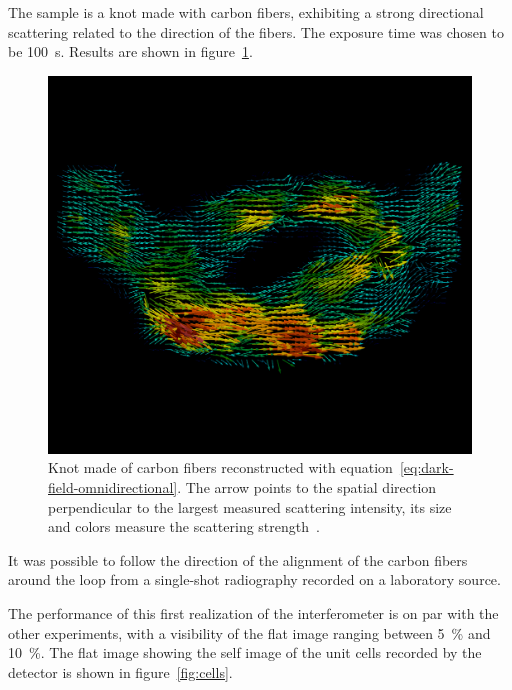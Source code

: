 The sample is a knot made with carbon fibers, exhibiting a strong
directional scattering related to the direction of the fibers. The exposure
time was chosen to be \SI{100}{\second}.
Results are shown in figure~\ref{fig:knot-reconstruction}.

\begin{figure}[htb]
    \centering
    \includegraphics[width=\textwidth]{gfx/omnidirectional/filtered.png}
    \caption{Knot made of carbon fibers reconstructed with
        equation~\eqref{eq:dark-field-omnidirectional}. The arrow points to
    the spatial direction perpendicular to the largest measured scattering
intensity, its size and colors measure the scattering
strength~\cite{kagias2018omnidir}.}
    \label{fig:knot-reconstruction}
\end{figure}

It was possible to follow the direction of the alignment of the
carbon fibers around the loop from a single-shot radiography recorded on a
laboratory source.

The performance of this first realization of the interferometer is on par
with the other experiments, with a visibility of the flat image ranging
between \SI{5}{\percent} and \SI{10}{\percent}. The flat image showing the
self image of the unit cells recorded by the detector is shown in
figure~\ref{fig:cells}.

